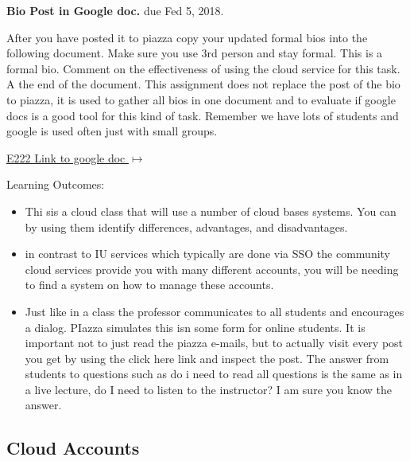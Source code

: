 \begin{exercise}\label{E:e222-bio-googledocs}

  {\bf Bio Post in Google doc.} due Fed 5, 2018. 
  
  After you have posted it to piazza
  copy your updated formal bios into the following document.  Make
  sure you use 3rd person and stay formal. This is a formal
  bio. Comment on the effectiveness of using the cloud service for
  this task. A the end of the document. This assignment does not
  replace the post of the bio to piazza, it is used to gather all bios
  in one document and to evaluate if google docs is a good tool for
  this kind of task. Remember we have lots of students and google is
  used often just with small groups.
 
 \smallskip

 {\hfill
   \href{https://docs.google.com/document/d/1pNK94qoRfZkill_JrGAzjd8aQ6Aar0pEXhU_Tgog0W0/edit?usp=sharing}{E222
     Link to google doc $\mapsto$}}

Learning Outcomes:
\begin{itemize}
\item Thi sis a cloud class that will use a number of cloud bases
  systems. You can by using them identify differences, advantages, and
  disadvantages.
\item in contrast to IU services which typically are done via SSO the
  community cloud services provide you with many different accounts,
  you will be needing to find a system on how to manage these
  accounts.
\item Just like in a class the professor communicates to all students
  and encourages a dialog. PIazza simulates this isn some form for
  online students. It is important not to just read the piazza
  e-mails, but to actually visit every post you get by using the click
  here link and inspect the post. The answer from students to
  questions such as do i need to read all questions is the same as in
  a live lecture, do I need to listen to the instructor? I am sure you
  know the answer.
\end{itemize}

 \end{exercise}


\subsection{Cloud Accounts}
\label{E:e222-iu-google-services}

